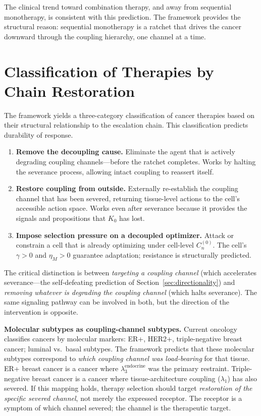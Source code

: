 \documentclass[11pt]{article}
\theoremstyle{definition}
\theoremstyle{remark}
\begin{document}
The clinical trend toward combination therapy, and away from
sequential monotherapy, is consistent with this prediction. The
framework provides the structural reason: sequential monotherapy
is a ratchet that drives the cancer downward through the coupling
hierarchy, one channel at a time.

\section{Classification of Therapies by Chain Restoration}
\label{sec:therapy}

The framework yields a three-category classification of cancer
therapies based on their structural relationship to the escalation
chain. This classification predicts durability of response.

\begin{enumerate}
\item \textbf{Remove the decoupling cause.} Eliminate the agent that
   is actively degrading coupling channels---before the ratchet
   completes. Works by halting the severance process, allowing
   intact coupling to reassert itself.
\item \textbf{Restore coupling from outside.} Externally re-establish
   the coupling channel that has been severed, returning
   tissue-level actions to the cell's accessible action space.
   Works even after severance because it provides the signals
   and propositions that $K_0$ has lost.
\item \textbf{Impose selection pressure on a decoupled optimizer.}
   Attack or constrain a cell that is already optimizing under
   cell-level $C_n^{(0)}$. The cell's $\gamma > 0$ and
   $\eta_M > 0$ guarantee adaptation; resistance is structurally
   predicted.
\end{enumerate}

\noindent The critical distinction is between \emph{targeting a
coupling channel} (which accelerates severance---the
self-defeating prediction of Section~\ref{sec:directionality})
and \emph{removing whatever is degrading the coupling channel}
(which halts severance). The same signaling pathway can be
involved in both, but the direction of the intervention is
opposite.

\textbf{Molecular subtypes as coupling-channel subtypes.}
Current oncology classifies cancers by molecular markers: ER+,
HER2+, triple-negative breast cancer; luminal vs.\ basal subtypes.
The framework predicts that these molecular subtypes correspond to
\emph{which coupling channel was load-bearing} for that tissue.
ER+ breast cancer is a cancer where
$\lambda_3^{\mathrm{endocrine}}$ was the primary restraint.
Triple-negative breast cancer is a cancer where tissue-architecture
coupling ($\lambda_1$) has also severed. If this mapping holds,
therapy selection should target \emph{restoration of the specific
severed channel}, not merely the expressed receptor. The receptor
is a symptom of which channel severed; the channel is the
therapeutic target.
\end{document}
